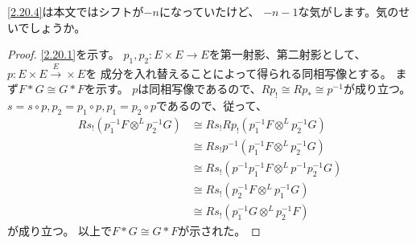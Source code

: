 \documentclass[uplatex,dvipdfmx]{jsarticle}
\begin{document}
\begin{rem*}
  \ref{2.20.4}は本文ではシフトが\(-n\)になっていたけど、
  \(-n-1\)な気がします。気のせいでしょうか。
\end{rem*}

\begin{proof}
  \ref{2.20.1}を示す。
  \(p_1,p_2:E\times E\to E\)を第一射影、第二射影として、
  \(p:E\times E\xrightarrow E\times E\)を
  成分を入れ替えることによって得られる同相写像とする。
  まず\(F*G\cong G*F\)を示す。
  \(p\)は同相写像であるので、\(Rp_! \cong Rp_*\cong p^{-1}\)が成り立つ。
  \(s = s\circ p, p_2 = p_1\circ p, p_1 = p_2\circ p\)であるので、従って、
  \begin{align*}
    Rs_!(p_1^{-1}F\otimes^L p_2^{-1}G)
    &\cong Rs_!Rp_!(p_1^{-1}F\otimes^L p_2^{-1}G) \\
    &\cong Rs_!p^{-1}(p_1^{-1}F\otimes^L p_2^{-1}G) \\
    &\cong Rs_!(p^{-1}p_1^{-1}F\otimes^L p^{-1}p_2^{-1}G) \\
    &\cong Rs_!(p_2^{-1}F\otimes^L p_1^{-1}G) \\
    &\cong Rs_!(p_1^{-1}G\otimes^L p_2^{-1}F)
  \end{align*}
  が成り立つ。
  以上で\(F*G\cong G*F\)が示された。


\end{proof}
\end{document}
